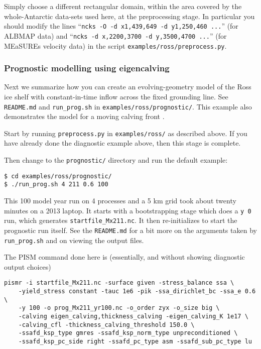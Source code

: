 Simply choose a different rectangular domain, within the area covered by the whole-Antarctic data-sets used here, at the preprocessing stage.  In particular you should modify the lines ``\texttt{ncks -O -d x1,439,649 -d y1,250,460 ...}'' (for ALBMAP data) and ``\texttt{ncks -d x,2200,3700 -d y,3500,4700 ...}'' (for MEaSUREs velocity data) in the script \texttt{examples/ross/preprocess.py}.

\subsubsection*{Prognostic modelling using eigencalving}  Next we summarize how you can create an evolving-geometry model of the Ross ice shelf with constant-in-time inflow across the fixed grounding line.  See \texttt{README.md} and \texttt{run_prog.sh} in \texttt{examples/ross/prognostic/}.  This example also demonstrates the  model for a moving calving front \cite{Levermannetal2012}.

Start by running \texttt{preprocess.py} in \texttt{examples/ross/} as described above.  If you have already done the diagnostic example above, then this stage is complete.

Then change to the \texttt{prognostic/} directory and run the default example:

\begin{verbatim}
$ cd examples/ross/prognostic/
$ ./run_prog.sh 4 211 0.6 100
\end{verbatim}

\noindent This 100 model year run on 4 processes and a 5 km grid took about twenty minutes on a 2013 laptop.  It starts with a bootstrapping stage which does a \texttt{y 0} run, which generates \texttt{startfile_Mx211.nc}.  It then re-initializes to start the prognostic run itself.  See the \texttt{README.md} for a bit more on the arguments taken by \texttt{run_prog.sh} and on viewing the output files.

The PISM command done here is (essentially, and without showing diagnostic output choices)

\begin{verbatim}
pismr -i startfile_Mx211.nc -surface given -stress_balance ssa \
    -yield_stress constant -tauc 1e6 -pik -ssa_dirichlet_bc -ssa_e 0.6 \
    -y 100 -o prog_Mx211_yr100.nc -o_order zyx -o_size big \
    -calving eigen_calving,thickness_calving -eigen_calving_K 1e17 \
    -calving_cfl -thickness_calving_threshold 150.0 \
    -ssafd_ksp_type gmres -ssafd_ksp_norm_type unpreconditioned \
    -ssafd_ksp_pc_side right -ssafd_pc_type asm -ssafd_sub_pc_type lu
\end{verbatim}

